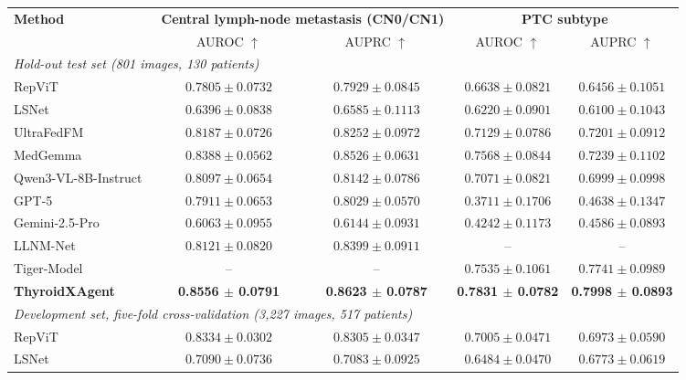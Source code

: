 \begin{table}[p]
\begin{threeparttable}
\begin{tabular}{lcccc}
\toprule
\multirow{2}{*}{\textbf{Method}}
& \multicolumn{2}{c}{\textbf{Central lymph-node metastasis (CN0/CN1)}}
& \multicolumn{2}{c}{\textbf{PTC subtype}} \\
& AUROC $\uparrow$ & AUPRC $\uparrow$ & AUROC $\uparrow$ & AUPRC $\uparrow$ \\
\midrule
\multicolumn{5}{l}{\textit{Hold-out test set (801 images, 130 patients)}} \\
\midrule
RepViT~\cite{wang2023repvit}
& $0.7805 \pm 0.0732$
& $0.7929 \pm 0.0845$
& $0.6638 \pm 0.0821$
& $0.6456 \pm 0.1051$\\
LSNet~\cite{wang2025lsnet}
& $0.6396 \pm 0.0838$
& $0.6585 \pm 0.1113$
& $0.6220 \pm 0.0901$
& $0.6100 \pm 0.1043$\\
UltraFedFM~\cite{jiang2025pretraining}
& $0.8187 \pm 0.0726$
& $0.8252 \pm 0.0972$
& $0.7129 \pm 0.0786$
& $0.7201 \pm 0.0912$\\
MedGemma~\cite{sellergren2025medgemma}
& $0.8388 \pm 0.0562$
& $0.8526 \pm 0.0631$
& $0.7568 \pm 0.0844$
& $0.7239 \pm 0.1102$\\
Qwen3-VL-8B-Instruct~\cite{bai2025qwen3}
& $0.8097 \pm 0.0654$
& $0.8142 \pm 0.0786$
& $0.7071 \pm 0.0821$
& $0.6999 \pm 0.0998$\\
GPT-5~\cite{openai2025gpt5systemcard}
& $0.7911 \pm 0.0653$
& $0.8029 \pm 0.0570$
& $0.3711 \pm 0.1706$
& $0.4638 \pm 0.1347$\\
Gemini-2.5-Pro~\cite{comanici_gemini_2025}
& $0.6063 \pm 0.0955$
& $0.6144 \pm 0.0931$
& $0.4242 \pm 0.1173$
& $0.4586 \pm 0.0893$\\
LLNM-Net~\cite{Shen2025NatCommunLLNM}
& $0.8121 \pm 0.0820$
& $0.8399 \pm 0.0911$
& --
& --\\
Tiger-Model~\cite{Dai2025NatCommunThyroidSubtype}
& --
& --
& $0.7535 \pm 0.1061$
& $0.7741 \pm 0.0989$\\
\rowcolor{lightgray}
\textbf{ThyroidXAgent}
& \textbf{0.8556 $\pm$ 0.0791}
& \textbf{0.8623 $\pm$ 0.0787}
& \textbf{0.7831 $\pm$ 0.0782}
& \textbf{0.7998 $\pm$ 0.0893}\\
\midrule
\multicolumn{5}{l}{\textit{Development set, five-fold cross-validation (3{,}227 images, 517 patients)}} \\
\midrule
RepViT~\cite{wang2023repvit}
& $0.8334 \pm 0.0302$
& $0.8305 \pm 0.0347$
& $0.7005 \pm 0.0471$
& $0.6973 \pm 0.0590$\\
LSNet~\cite{wang2025lsnet}
& $0.7090 \pm 0.0736$
& $0.7083 \pm 0.0925$
& $0.6484 \pm 0.0470$
& $0.6773 \pm 0.0619$\\

\end{tabular}
\end{threeparttable}
\end{table}
